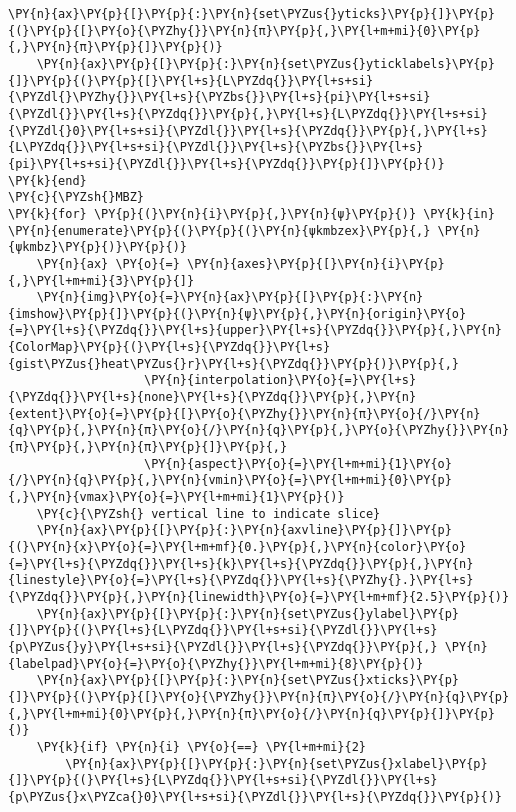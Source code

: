 \begin{Verbatim}[commandchars=\\\{\}]
    \PY{n}{ax}\PY{p}{[}\PY{p}{:}\PY{n}{set\PYZus{}yticks}\PY{p}{]}\PY{p}{(}\PY{p}{[}\PY{o}{\PYZhy{}}\PY{n}{π}\PY{p}{,}\PY{l+m+mi}{0}\PY{p}{,}\PY{n}{π}\PY{p}{]}\PY{p}{)}
    \PY{n}{ax}\PY{p}{[}\PY{p}{:}\PY{n}{set\PYZus{}yticklabels}\PY{p}{]}\PY{p}{(}\PY{p}{[}\PY{l+s}{L\PYZdq{}}\PY{l+s+si}{\PYZdl{}\PYZhy{}}\PY{l+s}{\PYZbs{}}\PY{l+s}{pi}\PY{l+s+si}{\PYZdl{}}\PY{l+s}{\PYZdq{}}\PY{p}{,}\PY{l+s}{L\PYZdq{}}\PY{l+s+si}{\PYZdl{}0}\PY{l+s+si}{\PYZdl{}}\PY{l+s}{\PYZdq{}}\PY{p}{,}\PY{l+s}{L\PYZdq{}}\PY{l+s+si}{\PYZdl{}}\PY{l+s}{\PYZbs{}}\PY{l+s}{pi}\PY{l+s+si}{\PYZdl{}}\PY{l+s}{\PYZdq{}}\PY{p}{]}\PY{p}{)}
\PY{k}{end}
\PY{c}{\PYZsh{}MBZ}
\PY{k}{for} \PY{p}{(}\PY{n}{i}\PY{p}{,}\PY{n}{ψ}\PY{p}{)} \PY{k}{in} \PY{n}{enumerate}\PY{p}{(}\PY{p}{(}\PY{n}{ψkmbzex}\PY{p}{,} \PY{n}{ψkmbz}\PY{p}{)}\PY{p}{)}
    \PY{n}{ax} \PY{o}{=} \PY{n}{axes}\PY{p}{[}\PY{n}{i}\PY{p}{,}\PY{l+m+mi}{3}\PY{p}{]}
    \PY{n}{img}\PY{o}{=}\PY{n}{ax}\PY{p}{[}\PY{p}{:}\PY{n}{imshow}\PY{p}{]}\PY{p}{(}\PY{n}{ψ}\PY{p}{,}\PY{n}{origin}\PY{o}{=}\PY{l+s}{\PYZdq{}}\PY{l+s}{upper}\PY{l+s}{\PYZdq{}}\PY{p}{,}\PY{n}{ColorMap}\PY{p}{(}\PY{l+s}{\PYZdq{}}\PY{l+s}{gist\PYZus{}heat\PYZus{}r}\PY{l+s}{\PYZdq{}}\PY{p}{)}\PY{p}{,}
                   \PY{n}{interpolation}\PY{o}{=}\PY{l+s}{\PYZdq{}}\PY{l+s}{none}\PY{l+s}{\PYZdq{}}\PY{p}{,}\PY{n}{extent}\PY{o}{=}\PY{p}{[}\PY{o}{\PYZhy{}}\PY{n}{π}\PY{o}{/}\PY{n}{q}\PY{p}{,}\PY{n}{π}\PY{o}{/}\PY{n}{q}\PY{p}{,}\PY{o}{\PYZhy{}}\PY{n}{π}\PY{p}{,}\PY{n}{π}\PY{p}{]}\PY{p}{,}
                   \PY{n}{aspect}\PY{o}{=}\PY{l+m+mi}{1}\PY{o}{/}\PY{n}{q}\PY{p}{,}\PY{n}{vmin}\PY{o}{=}\PY{l+m+mi}{0}\PY{p}{,}\PY{n}{vmax}\PY{o}{=}\PY{l+m+mi}{1}\PY{p}{)}
    \PY{c}{\PYZsh{} vertical line to indicate slice}
    \PY{n}{ax}\PY{p}{[}\PY{p}{:}\PY{n}{axvline}\PY{p}{]}\PY{p}{(}\PY{n}{x}\PY{o}{=}\PY{l+m+mf}{0.}\PY{p}{,}\PY{n}{color}\PY{o}{=}\PY{l+s}{\PYZdq{}}\PY{l+s}{k}\PY{l+s}{\PYZdq{}}\PY{p}{,}\PY{n}{linestyle}\PY{o}{=}\PY{l+s}{\PYZdq{}}\PY{l+s}{\PYZhy{}.}\PY{l+s}{\PYZdq{}}\PY{p}{,}\PY{n}{linewidth}\PY{o}{=}\PY{l+m+mf}{2.5}\PY{p}{)}
    \PY{n}{ax}\PY{p}{[}\PY{p}{:}\PY{n}{set\PYZus{}ylabel}\PY{p}{]}\PY{p}{(}\PY{l+s}{L\PYZdq{}}\PY{l+s+si}{\PYZdl{}}\PY{l+s}{p\PYZus{}y}\PY{l+s+si}{\PYZdl{}}\PY{l+s}{\PYZdq{}}\PY{p}{,} \PY{n}{labelpad}\PY{o}{=}\PY{o}{\PYZhy{}}\PY{l+m+mi}{8}\PY{p}{)}
    \PY{n}{ax}\PY{p}{[}\PY{p}{:}\PY{n}{set\PYZus{}xticks}\PY{p}{]}\PY{p}{(}\PY{p}{[}\PY{o}{\PYZhy{}}\PY{n}{π}\PY{o}{/}\PY{n}{q}\PY{p}{,}\PY{l+m+mi}{0}\PY{p}{,}\PY{n}{π}\PY{o}{/}\PY{n}{q}\PY{p}{]}\PY{p}{)}
    \PY{k}{if} \PY{n}{i} \PY{o}{==} \PY{l+m+mi}{2}
        \PY{n}{ax}\PY{p}{[}\PY{p}{:}\PY{n}{set\PYZus{}xlabel}\PY{p}{]}\PY{p}{(}\PY{l+s}{L\PYZdq{}}\PY{l+s+si}{\PYZdl{}}\PY{l+s}{p\PYZus{}x\PYZca{}0}\PY{l+s+si}{\PYZdl{}}\PY{l+s}{\PYZdq{}}\PY{p}{)}

\end{Verbatim}
